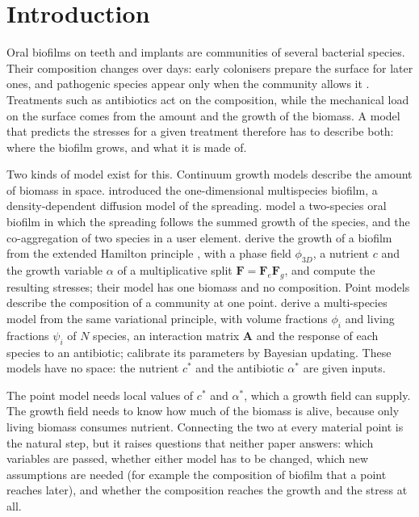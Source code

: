 \documentclass[11pt,a4paper]{article}
\newcommand{\phiD}{\phi_{3D}}
\begin{document}
\section{Introduction}
\label{sec:intro}

Oral biofilms on teeth and implants are communities of several bacterial species. Their composition changes over days: early colonisers prepare the surface for later ones, and pathogenic species appear only when the community allows it \citep{Heine2025PeriImplant}. Treatments such as antibiotics act on the composition, while the mechanical load on the surface comes from the amount and the growth of the biomass. A model that predicts the stresses for a given treatment therefore has to describe both: where the biofilm grows, and what it is made of.

Two kinds of model exist for this. Continuum growth models describe the amount of biomass in space. \citet{WannerGujer1986} introduced the one-dimensional multispecies biofilm, \citet{Eberl2001Biofilm} a density-dependent diffusion model of the spreading. \citet{Feng2021SymbioticBiofilm} model a two-species oral biofilm in which the spreading follows the summed growth of the species, and \citet{Soleimani2023CoAggregation} the co-aggregation of two species in a user element. \citet{Klempt2024DiffusionDrivenGrowth} derive the growth of a biofilm from the extended Hamilton principle \citep{JunkerBalzani2021ExtendedHamilton}, with a phase field $\phiD$, a nutrient $c$ and the growth variable $\alpha$ of a multiplicative split $\mathbf F=\mathbf F_e\mathbf F_g$, and compute the resulting stresses; their model has one biomass and no composition. Point models describe the composition of a community at one point. \citet{Klempt2026ContinuumBacterialGrowth} derive a multi-species model from the same variational principle, with volume fractions $\phi_i$ and living fractions $\psi_i$ of $N$ species, an interaction matrix $\mathbf A$ and the response of each species to an antibiotic; \citet{Fritsch2025BayesianMicrofilms} calibrate its parameters by Bayesian updating. These models have no space: the nutrient $c^*$ and the antibiotic $\alpha^*$ are given inputs.

The point model needs local values of $c^*$ and $\alpha^*$, which a growth field can supply. The growth field needs to know how much of the biomass is alive, because only living biomass consumes nutrient. Connecting the two at every material point is the natural step, but it raises questions that neither paper answers: which variables are passed, whether either model has to be changed, which new assumptions are needed (for example the composition of biofilm that a point reaches later), and whether the composition reaches the growth and the stress at all.
\end{document}

